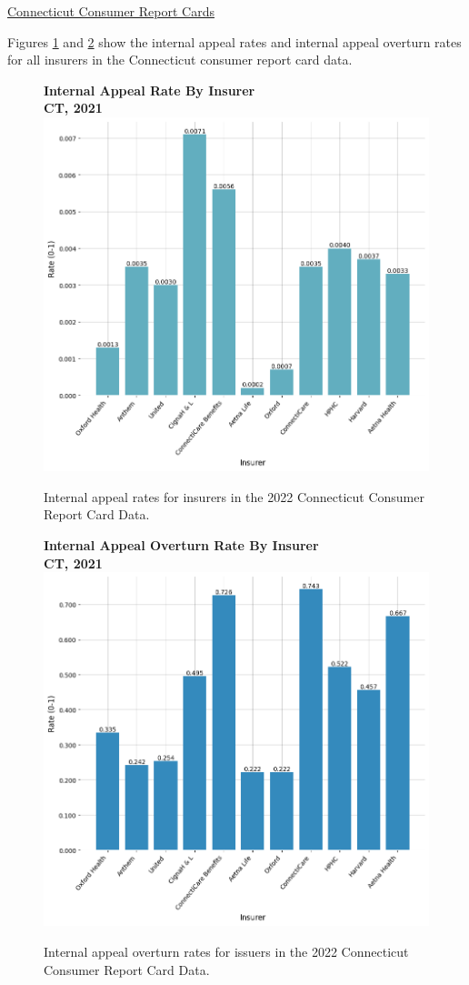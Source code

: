 \documentclass[12pt, a4paper,twoside,parskip=full]{report}
\theoremstyle{plain} %
\theoremstyle{definition} %
\theoremstyle{remark} %
\numberwithin{equation}{chapter}
\begin{document}
		\clearpage
		
		
		\underline{Connecticut Consumer Report Cards}

		Figures \ref{ctinternalappealratebyinsurer} and \ref{ctinternalappealoverturnratebyinsurer} show the internal appeal rates and internal appeal overturn rates for all insurers in the Connecticut consumer report card data.
		
		\begin{figure}[h!]
			\centering
			\textbf{Internal Appeal Rate By Insurer}\\
			\textbf{CT, 2021}\\
			\includegraphics[width=.8\columnwidth]{images/ct_claims/appeal_rate_by_insurer.png}
			\caption{Internal appeal rates for insurers in the 2022 Connecticut Consumer Report Card Data.}
			\label{ctinternalappealratebyinsurer}
		\end{figure}
		
		
		\begin{figure}[h!]
			\centering
			\textbf{Internal Appeal Overturn Rate By Insurer}\\
			\textbf{CT, 2021}\\
			\includegraphics[width=.8\columnwidth]{images/ct_claims/internal_appeal_overturn_rate_by_insurer.png}
			\caption{Internal appeal overturn rates for issuers in the 2022 Connecticut Consumer Report Card Data.}
			\label{ctinternalappealoverturnratebyinsurer}
		\end{figure}
		
\end{document}
